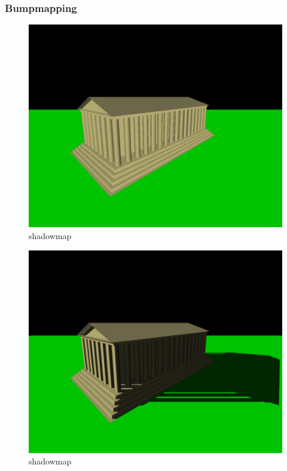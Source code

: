\subsubsection{Bumpmapping}
\begin{figure}[H]
    \centering
    \includegraphics[width=1.0\textwidth]{images/sm_ns.png}
    \caption{shadowmap}
\end{figure}

\begin{figure}[H]
    \centering
    \includegraphics[width=1.0\textwidth]{images/sm_ws.png}
    \caption{shadowmap}
\end{figure}

